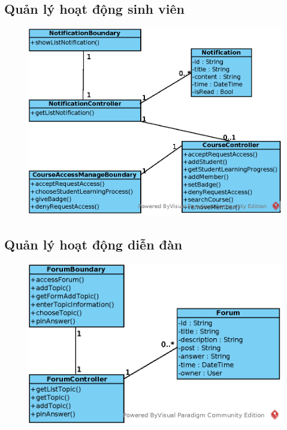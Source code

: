 \documentclass[./../main_file.tex]{subfiles}
\begin{document}
	\subsection{Quản lý hoạt động sinh viên }
	\begin{figure}[H]
		\centering
		\includegraphics[width=\linewidth]{./images/VOPCs/3_11_manage_studentactivity.eps}
	\end{figure}
	
	\subsection{Quản lý hoạt động diễn đàn}
	\begin{figure}[H]
		\centering
		\includegraphics[width=\linewidth]{./images/VOPCs/3_12_manage_forum.eps}
	\end{figure}
	
\end{document}
